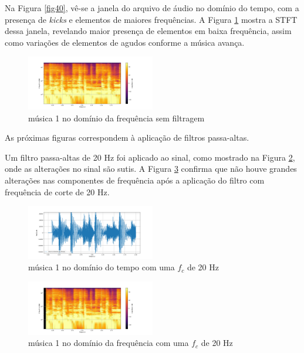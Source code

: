 Na Figura \ref{fig40}, vê-se a janela do arquivo de áudio no domínio do tempo, com a presença de \textit{kicks} e elementos de maiores frequências. A Figura \ref{fig41} mostra a STFT dessa janela, revelando maior presença de elementos em baixa frequência, assim como variações de elementos de agudos conforme a música avança.

\begin{figure}[h]
	\centering
    \includegraphics[width=0.5\textwidth]{figuras/fig41.png}
	\caption{música 1 no domínio da frequência sem filtragem}
	\label{fig41}
\end{figure}

As próximas figuras correspondem à aplicação de filtros passa-altas.

Um filtro passa-altas de 20 Hz foi aplicado ao sinal, como mostrado na Figura \ref{fig24}, onde as alterações no sinal são sutis. A Figura \ref{fig25} confirma que não houve grandes alterações nas componentes de frequência após a aplicação do filtro com frequência de corte de 20 Hz.

\begin{figure}[h]
	\centering
    \includegraphics[width=0.5\textwidth]{figuras/fig24.png}
	\caption{música 1 no domínio do tempo com uma $f_c$ de 20 Hz}
	\label{fig24}
\end{figure}

\begin{figure}[h]
	\centering
    \includegraphics[width=0.5\textwidth]{figuras/fig25.png}
	\caption{música 1 no domínio da frequência com uma $f_c$ de 20 Hz}
	\label{fig25}
\end{figure}

